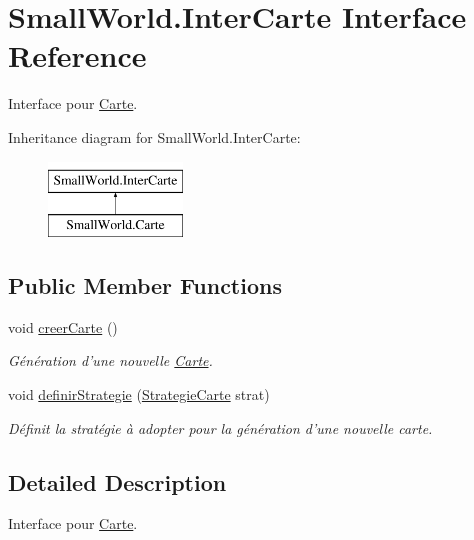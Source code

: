 \hypertarget{interface_small_world_1_1_inter_carte}{\section{Small\-World.\-Inter\-Carte Interface Reference}
\label{interface_small_world_1_1_inter_carte}
}


Interface pour \hyperlink{class_small_world_1_1_carte}{Carte}.  


Inheritance diagram for Small\-World.\-Inter\-Carte\-:\begin{figure}[H]
\begin{center}
\leavevmode
\includegraphics[height=2.000000cm]{interface_small_world_1_1_inter_carte}
\end{center}
\end{figure}
\subsection*{Public Member Functions}
\begin{DoxyCompactItemize}
\item 
void \hyperlink{interface_small_world_1_1_inter_carte_a825e1748eb1a8f93dfe8aecdfc661064}{creer\-Carte} ()
\begin{DoxyCompactList}\small\item\em Génération d'une nouvelle \hyperlink{class_small_world_1_1_carte}{Carte}. \end{DoxyCompactList}\item 
void \hyperlink{interface_small_world_1_1_inter_carte_a23c669cb523f222f53e8ab91a8944472}{definir\-Strategie} (\hyperlink{class_small_world_1_1_strategie_carte}{Strategie\-Carte} strat)
\begin{DoxyCompactList}\small\item\em Définit la stratégie à adopter pour la génération d'une nouvelle carte. \end{DoxyCompactList}\end{DoxyCompactItemize}


\subsection{Detailed Description}
Interface pour \hyperlink{class_small_world_1_1_carte}{Carte}. 

